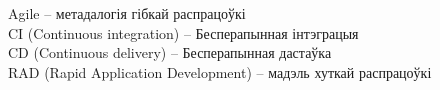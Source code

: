 \thispagestyle{empty}
\noindent%
Agile -- метадалогія гібкай распрацоўкі \\
CI (Continuous integration) -- Бесперапынная інтэграцыя \\
CD (Continuous delivery) -- Бесперапынная дастаўка \\
RAD (Rapid Application Development) -- мадэль хуткай распрацоўкі
\clearpage
